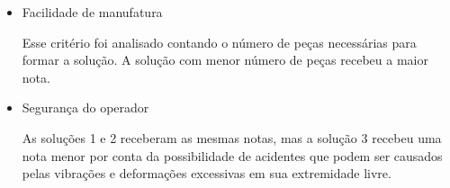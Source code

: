 \begin{itemize}
    \item Facilidade de manufatura
    
    Esse critério foi analisado contando o número de peças necessárias para formar a solução. A solução com menor número de peças recebeu a maior nota.
    
    \item Segurança do operador
    
    As soluções 1 e 2 receberam as mesmas notas, mas a solução 3 recebeu uma nota menor por conta da possibilidade de acidentes que podem ser causados pelas vibrações e deformações excessivas em sua extremidade livre.
    
\end{itemize}



